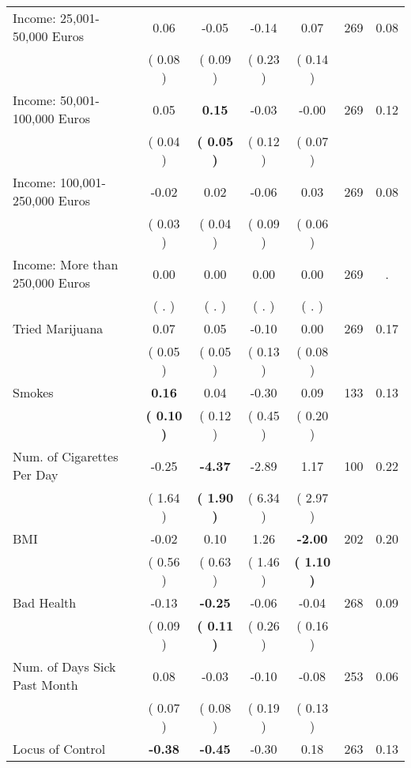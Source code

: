 \begin{tabular}{lcccccc}
Income: 25,001-50,000 Euros &      0.06 &     -0.05 &     -0.14 &      0.07 & 269 &      0.08 \\ 
 & (     0.08 ) & (     0.09 ) & (     0.23 ) & (     0.14 ) & \\
Income: 50,001-100,000 Euros &      0.05 & \textbf{     0.15} &     -0.03 &     -0.00 & 269 &      0.12 \\ 
 & (     0.04 ) & \textbf{(     0.05 )} & (     0.12 ) & (     0.07 ) & \\
Income: 100,001-250,000 Euros &     -0.02 &      0.02 &     -0.06 &      0.03 & 269 &      0.08 \\ 
 & (     0.03 ) & (     0.04 ) & (     0.09 ) & (     0.06 ) & \\
Income: More than 250,000 Euros &      0.00 &      0.00 &      0.00 &      0.00 & 269 &         . \\ 
 & (        . ) & (        . ) & (        . ) & (        . ) & \\
Tried Marijuana &      0.07 &      0.05 &     -0.10 &      0.00 & 269 &      0.17 \\ 
 & (     0.05 ) & (     0.05 ) & (     0.13 ) & (     0.08 ) & \\
Smokes & \textbf{     0.16} &      0.04 &     -0.30 &      0.09 & 133 &      0.13 \\ 
 & \textbf{(     0.10 )} & (     0.12 ) & (     0.45 ) & (     0.20 ) & \\
Num. of Cigarettes Per Day &     -0.25 & \textbf{    -4.37} &     -2.89 &      1.17 & 100 &      0.22 \\ 
 & (     1.64 ) & \textbf{(     1.90 )} & (     6.34 ) & (     2.97 ) & \\
BMI &     -0.02 &      0.10 &      1.26 & \textbf{    -2.00} & 202 &      0.20 \\ 
 & (     0.56 ) & (     0.63 ) & (     1.46 ) & \textbf{(     1.10 )} & \\
Bad Health &     -0.13 & \textbf{    -0.25} &     -0.06 &     -0.04 & 268 &      0.09 \\ 
 & (     0.09 ) & \textbf{(     0.11 )} & (     0.26 ) & (     0.16 ) & \\
Num. of Days Sick Past Month &      0.08 &     -0.03 &     -0.10 &     -0.08 & 253 &      0.06 \\ 
 & (     0.07 ) & (     0.08 ) & (     0.19 ) & (     0.13 ) & \\
Locus of Control & \textbf{    -0.38} & \textbf{    -0.45} &     -0.30 &      0.18 & 263 &      0.13 \\ 

\end{tabular}
